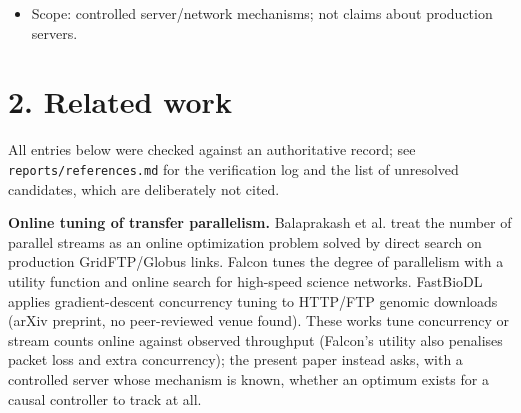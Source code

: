 \documentclass{ieeeaccess}
\begin{document}
\begin{itemize}
\begin{enumerate}
\item Existence results for adaptive (N,S) selection/control \textbf{under an explicitly constructed N-dependent server model} (§6, §7): within-download improvement over the best stationary configuration (\textbf{Confirmed}, n=10 blocks); cross-workload selection (\textbf{Descriptive}; consistency across the family not established).
\item An engine ablation showing that a whole-request timeout and missing straggler splitting, not control, explained aria2's lead under the cap, after which the best fixed configuration beat the adaptive controllers (\textbf{Confirmed}, §7a); and a live-rate control server showing that the large-range advantage depends on the server fixing a response's rate on arrival (§9c).
\item An inventory of learned-policy experiments (§9): the early candidates are negative or descriptive; agents retrained for the capped server beat the fixed configuration with their own range size where trained, generalized partially inside a broadened training envelope, and failed a no-harm check on public mirrors (§8a).
\end{enumerate}
\item Scope: controlled server/network mechanisms; not claims about production servers.
\end{itemize}

\section*{2. Related work}

All entries below were checked against an authoritative record; see \texttt{reports/\allowbreak{}references.md} for the verification log and the list of unresolved candidates, which are deliberately not cited.


\textbf{Online tuning of transfer parallelism.} Balaprakash et al. \cite{balaprakash2016direct} treat the number of parallel streams as an online optimization problem solved by direct search on production GridFTP/Globus links. Falcon \cite{arifuzzaman2023falcon,arifuzzaman2021online} tunes the degree of parallelism with a utility function and online search for high-speed science networks. FastBioDL \cite{swargo2025fastbiodl} applies gradient-descent concurrency tuning to HTTP/FTP genomic downloads (arXiv preprint, no peer-reviewed venue found). These works tune concurrency or stream counts online against observed throughput (Falcon's utility also penalises packet loss and extra concurrency); the present paper instead asks, with a controlled server whose mechanism is known, whether an optimum exists for a causal controller to track at all.
\end{document}
